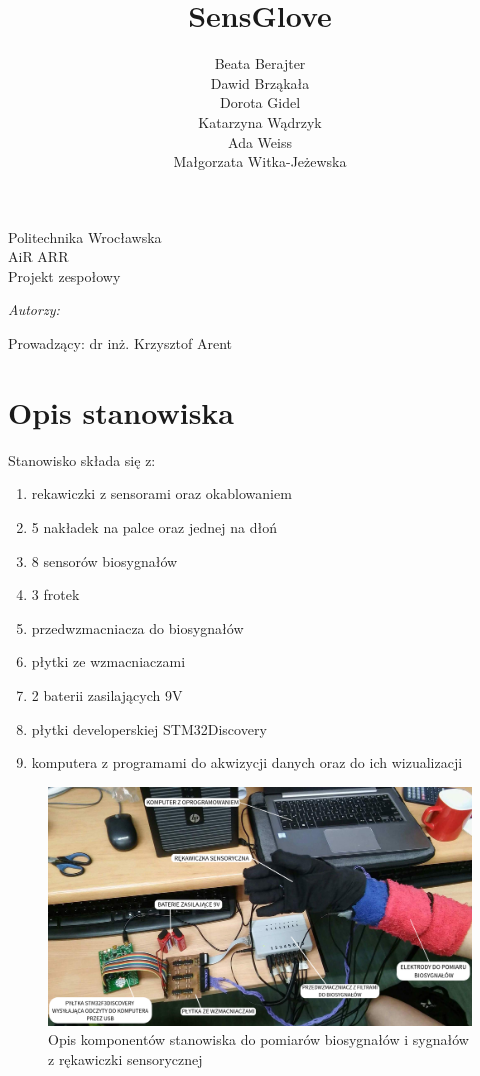 \documentclass{article}
\author{Beata Berajter\\
Dawid Brząkała\\
Dorota Gidel\\
Katarzyna Wądrzyk\\
Ada Weiss\\
Małgorzata Witka-Jeżewska\\
 }
\title{SensGlove}
\makeatletter
\renewcommand{\maketitle}{\begin{titlepage}
    \vspace*{1cm}
    \begin{center}
    Politechnika Wrocławska\\
    AiR ARR\\
 Projekt zespołowy
    \end{center}
      \vspace{3cm}
    \begin{center}

     \LARGE \textsc {\@title}
         \end{center}
     \vspace{1cm}

    \begin{center}
    \textit{ Autorzy:}\\
   \textit{\@author}
     \end{center}
      \vspace{1cm}

     \begin{center}

    Prowadzący:
  dr inż. Krzysztof Arent
    \end{center}

    \vspace*{\stretch{6}}
    \begin{center}
    \@date
    \end{center}
  \end{titlepage}
}
\makeatother
\begin{document}
\maketitle
\newpage
\tableofcontents
\newpage




%
%
%
%
%
\section{Opis stanowiska}
Stanowisko składa się z:
\begin{enumerate}
	\item rekawiczki z sensorami oraz okablowaniem
	\item 5 nakładek na palce oraz jednej na dłoń
	\item 8 sensorów biosygnałów
	\item 3 frotek
	\item przedwzmacniacza do biosygnałów
	\item płytki ze wzmacniaczami
	\item 2 baterii zasilających 9V
	\item płytki developerskiej STM32Discovery
	\item komputera z programami do akwizycji danych oraz do ich wizualizacji	
\end{enumerate}

\begin{figure}[H]
	\centering
	\includegraphics[width=16cm]{rekawiczka_opis_stanowiska.png}
	\caption{Opis komponentów stanowiska do pomiarów biosygnałów i sygnałów z rękawiczki sensorycznej}
	\label{rys:stanowisko}
\end{figure}
\end{document}
